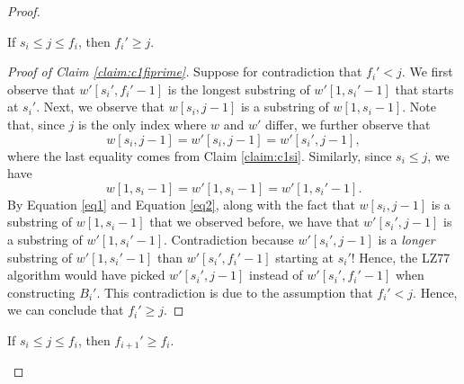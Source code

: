 \begin{proof}
\begin{enumerate}
    \begin{claim}\label{claim:c1fiprime}
        If $s_i\leq j\leq f_i$, then $f_i'\geq j$.
    \end{claim}
    
    \begin{proof}[Proof of Claim \ref{claim:c1fiprime}]
        Suppose for contradiction that $f_i'<j$. We first observe that $w'[s_i',f_i'-1]$ is the longest substring of $w'[1,s_i'-1]$ that starts at $s_i'$. Next, we observe that $w[s_i,j-1]$ is a substring of $w[1,s_i-1]$. Note that, since $j$ is the only index where $w$ and $w'$ differ, we further observe that 
        \begin{equation}\label{eq1}
            w[s_i,j-1]=w'[s_i,j-1]=w'[s_i',j-1],
        \end{equation}
        where the last equality comes from Claim \ref{claim:c1si}. Similarly, since $s_i\leq j$, we have 
        \begin{equation}\label{eq2}
            w[1,s_i-1]=w'[1,s_i-1]=w'[1,s_i'-1].
        \end{equation}
        By Equation \eqref{eq1} and Equation \eqref{eq2}, along with the fact that $w[s_i,j-1]$ is a substring of $w[1,s_i-1]$ that we observed before, we have that $w'[s_i',j-1]$ is a substring of $w'[1,s_i'-1]$. Contradiction because $w'[s_i',j-1]$ is a \emph{longer} substring of $w'[1,s_i'-1]$ than $w'[s_i',f_i'-1]$ starting at $s_i'$! Hence, the LZ77 algorithm would have picked $w'[s_i',j-1]$ instead of $w'[s_i',f_i'-1]$ when constructing $B_i'$. This contradiction is due to the assumption that $f_i'<j$. Hence, we can conclude that $f_i'\geq j$.
        \end{proof}


    
\begin{claim}\label{claim:c1fprime+1geqfi}
    If $s_i\leq j\leq f_i$, then $f_{i+1}'\geq f_i$.
    \end{claim}
    
    

\end{enumerate}
\end{proof}

